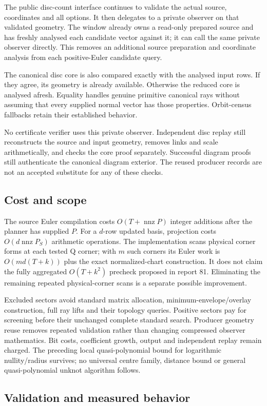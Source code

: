 The public disc-count interface continues to validate the actual source,
coordinates and all options. It then delegates to a private observer on that
validated geometry. The window already owns a read-only prepared source and
has freshly analysed each candidate vector against it; it can call the same
private observer directly. This removes an additional source preparation
and coordinate analysis from each positive-Euler candidate query.

The canonical disc core is also compared exactly with the analysed input
rows. If they agree, its geometry is already available. Otherwise the reduced
core is analysed afresh. Equality handles genuine primitive canonical rays
without assuming that every supplied normal vector has those properties.
Orbit-census fallbacks retain their established behavior.

No certificate verifier uses this private observer. Independent disc replay
still reconstructs the source and input geometry, removes links and scale
arithmetically, and checks the core proof separately. Successful diagram
proofs still authenticate the canonical diagram exterior. The reused producer
records are not an accepted substitute for any of these checks.

\subsection{Cost and scope}

The source Euler compilation costs $O(T+\operatorname{nnz}P)$ integer
additions after the planner has supplied $P$. For a $d$-row updated basis,
projection costs $O(d\operatorname{nnz}P_S)$ arithmetic operations.
The implementation scans physical corner forms at each tested Q corner;
with $m$ such corners its Euler work is
$O(m d(T+k))$ plus the exact normalized-chart construction.
It does not claim the fully aggregated $O(T+k^2)$ precheck proposed in
report 81. Eliminating the remaining repeated physical-corner scans is a
separate possible improvement.

Excluded sectors avoid standard matrix allocation, minimum-envelope/overlay
construction, full ray lifts and their topology queries. Positive sectors
pay for screening before their unchanged complete standard search.
Producer geometry reuse removes repeated validation rather than changing
compressed observer mathematics. Bit costs, coefficient growth, output and
independent replay remain charged. The preceding local quasi-polynomial
bound for logarithmic nullity/radius survives; no universal centre family,
distance bound or general quasi-polynomial unknot algorithm follows.

\subsection{Validation and measured behavior}

